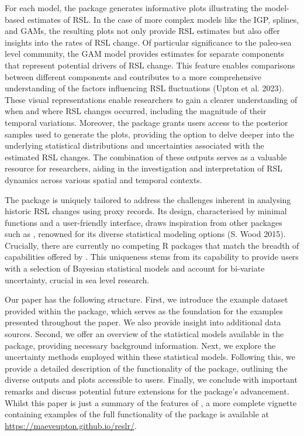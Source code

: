 For each model, the  package generates informative plots illustrating the model-based estimates of RSL. In the case of more complex models like the IGP, splines, and GAMs, the resulting plots not only provide RSL estimates but also offer insights into the rates of RSL change. Of particular significance to the paleo-sea level community, the GAM model provides estimates for separate components that represent potential drivers of RSL change. This feature enables comparisons between different components and contributes to a more comprehensive understanding of the factors influencing RSL fluctuations (Upton et al. 2023). These visual representations enable researchers to gain a clearer understanding of when and where RSL changes occurred, including the magnitude of their temporal variations. Moreover, the package grants users access to the posterior samples used to generate the plots, providing the option to delve deeper into the underlying statistical distributions and uncertainties associated with the estimated RSL changes. The combination of these outputs serves as a valuable resource for researchers, aiding in the investigation and interpretation of RSL dynamics across various spatial and temporal contexts.

The  package is uniquely tailored to address the challenges inherent in analysing historic RSL changes using proxy records. Its design, characterised by minimal functions and a user-friendly interface, draws inspiration from other packages such as , renowned for its diverse statistical modeling options (S. Wood 2015). Crucially, there are currently no competing R packages that match the breadth of capabilities offered by . This uniqueness stems from its capability to provide users with a selection of Bayesian statistical models and account for bi-variate uncertainty, crucial in sea level research.

Our paper has the following structure. First, we introduce the example dataset provided within the package, which serves as the foundation for the examples presented throughout the paper. We also provide insight into additional data sources. Second, we offer an overview of the statistical models available in the package, providing necessary background information. Next, we explore the uncertainty methods employed within these statistical models. Following this, we provide a detailed description of the functionality of the  package, outlining the diverse outputs and plots accessible to users. Finally, we conclude with important remarks and discuss potential future extensions for the package's advancement. Whilst this paper is just a summary of the features of , a more complete vignette containing examples of the full functionality of the package is available at \url{https://maeveupton.github.io/reslr/}.

